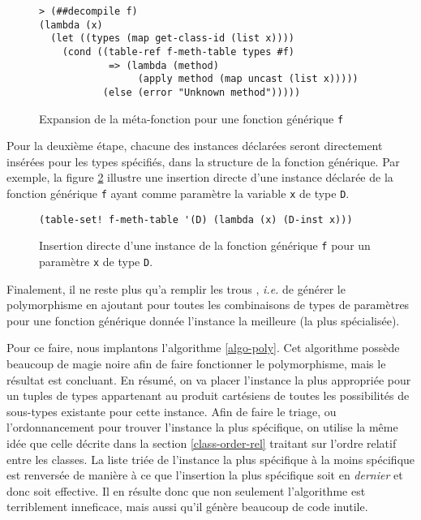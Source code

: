       \begin{figure}[h!]
        \begin{lstlisting}
> (##decompile f)
(lambda (x)
  (let ((types (map get-class-id (list x))))
    (cond ((table-ref f-meth-table types #f)
            => (lambda (method) 
                 (apply method (map uncast (list x)))))
           (else (error "Unknown method")))))
        \end{lstlisting}
        \caption{Expansion de la méta-fonction pour une fonction
          générique \texttt{f}}
        \label{meta-genfun}
      \end{figure}
      
      Pour la deuxième étape, chacune des instances déclarées seront
      directement insérées pour les types spécifiés, dans la structure
      de la fonction générique. Par exemple, la figure
      \ref{ex-insertion-directe-meth} illustre une insertion directe
      d'une instance déclarée de la fonction générique \texttt{f}
      ayant comme paramètre la variable \texttt{x} de type \texttt{D}.

      \begin{figure}[h!]
        \begin{lstlisting}
(table-set! f-meth-table '(D) (lambda (x) (D-inst x)))
        \end{lstlisting}
        \caption{Insertion directe d'une instance de la fonction
          générique \texttt{f} pour un paramètre \texttt{x} de type
          \texttt{D}.}
        \label{ex-insertion-directe-meth}
      \end{figure}

      Finalement, il ne reste plus qu'a \og remplir les trous \fg,
      \textit{i.e.} de générer le polymorphisme en ajoutant pour
      toutes les combinaisons de types de paramètres pour une fonction
      générique donnée l'instance la meilleure (la plus spécialisée).

      Pour ce faire, nous implantons l'algorithme \ref{algo-poly}. Cet
      algorithme possède beaucoup de \og magie noire \fg afin de faire
      fonctionner le polymorphisme, mais le résultat est concluant. En
      résumé, on va placer l'instance la plus appropriée pour un
      tuples de types appartenant au produit cartésiens de toutes les
      possibilités de sous-types existante pour cette instance. Afin de
      faire le triage, ou l'ordonnancement pour trouver l'instance la
      plus spécifique, on utilise la même idée que celle décrite dans
      la section \ref{class-order-rel} traitant sur l'ordre relatif
      entre les classes. La liste triée de l'instance la plus
      spécifique à la moins spécifique est renversée de manière à ce
      que l'insertion la plus spécifique soit en \emph{dernier} et
      donc soit effective. Il en résulte donc que non seulement
      l'algorithme est terriblement inneficace, mais aussi qu'il
      génère beaucoup de code inutile.

